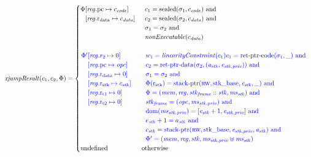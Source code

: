 \documentclass[a4paper]{article}
\begin{document}
\begin{align*}
  \xjumpResult{c_1}{c_2}{\Phi} = 
  \begin{cases}
    \arraycolsep=0pt
    \begin{array}[t]{rl}
      \Phi & \updReg{\pcreg}{c_\code}\\
           & \updReg{\rdata}{c_\data}
    \end{array} &
    \begin{array}[t]{l}
      c_1 = \sealed{\sigma_1,c_\code} \tand \\
      c_2 = \sealed{\sigma_2,c_\data} \tand \\
      \sigma_1 = \sigma_2 \tand \\
      \nonExec{c_\data}
    \end{array}
    \\&\\
    \sourcecolor\left.
      \arraycolsep=0pt
      \begin{array}[t]{rl}
        \Phi' & \updReg{r_2}{0} \\
              & \updReg{\pcreg}{\opc}\\
              & \updReg{\rdata}{0}\\
              & \updReg{\rstk}{c_\stk}\\
              & \updReg{\rtmp{1}}{0}\\
              & \updReg{\rtmp{2}}{0}
      \end{array}\right.&
    \sourcecolor\left.
      \begin{array}[t]{l}
        w_1 = \linCons{c_1}
        c_1 = \retptrc(\sigma_1,\_) \tand \\
        c_2 = \retptrd(\sigma_2,(\aaddr_\stk,\eaddr_{\stk,\priv})) \tand \\
        \sigma_1 = \sigma_2 \tand\\
        \Phi(\rstk) = \stkptr{\rw,\stkb,\eaddr_\stk,\_} \tand \\ 
        \Phi = (\mem,\reg,\stkf::\stk,\ms_\stk) \tand \\
        \stkf = (\opc,\ms_{\stk,\priv}) \tand \\
        \dom(\ms_{\stk,\priv}) = [\eaddr_\stk+1,\eaddr_{\stk,\priv}] \tand\\
        e_\stk + 1 = a_\stk \tand\\
        c_\stk = \stkptr{\rw,\stkb,\eaddr_{\stk,\priv},\aaddr_\stk} \tand\\
        \Phi' = (\mem,\reg,\stk,\ms_{\stk,\priv} \uplus \ms_\stk) 
      \end{array}\right.
    \\
    \tundefined & \totherwise
  \end{cases}
\end{align*}
\end{document}
